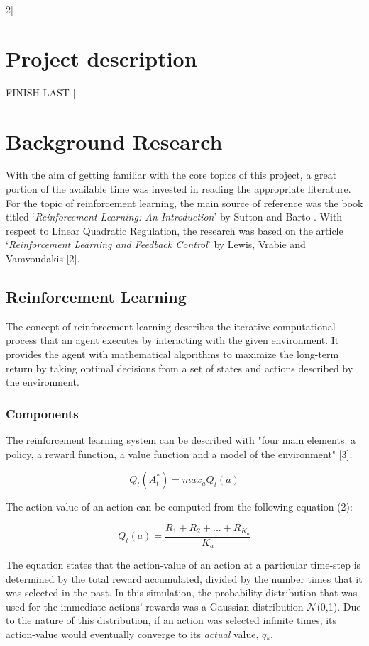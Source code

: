 \documentclass[a4paper]{article}
\begin{document}
	\begin{multicols}{2}[
		\section*{Project description}
		FINISH LAST
		]
		
		\section{Background Research}
		With the aim of getting familiar with the core topics of this project, a great portion of the available time was invested in reading the appropriate literature. For the topic of reinforcement learning, the main source of reference was the book titled `\textit{Reinforcement Learning: An Introduction}' by Sutton and Barto \cite{DUMMY:1}. With respect to Linear Quadratic Regulation, the research was based on the article `\textit{Reinforcement Learning and Feedback Control}' by Lewis, Vrabie and Vamvoudakis [2].
		
		\subsection{Reinforcement Learning}
		The concept of reinforcement learning describes the iterative computational process that an agent executes by interacting with the given environment. It provides the agent with mathematical algorithms to maximize the long-term return by taking optimal decisions from a set of states and actions described by the environment. 
		
		\subsubsection{Components}
		The reinforcement learning system can be described with "four main elements: a policy, a reward function, a value function and a model of the environment" [3].
		
		\begin{equation}
			Q_t(A_t^*) = max_a Q_t(a)
		\end{equation}
		
		The action-value of an action can be computed from the following equation (2):
		
		\begin{equation}
			Q_t(a) = \frac{R_1 + R_2 + ... + R_{K_a}}{K_a}
		\end{equation}

		The equation states that the action-value of an action at a particular time-step is determined by the total reward accumulated, divided by the number times that it was selected in the past. In this simulation, the probability distribution that was used for the immediate actions' rewards was a Gaussian distribution $\mathcal{N}$(0,1). Due to the nature of this distribution, if an action was selected infinite times, its action-value would eventually converge to its \textit{actual} value, $q_*$.
		

\end{multicols}
\end{document}
